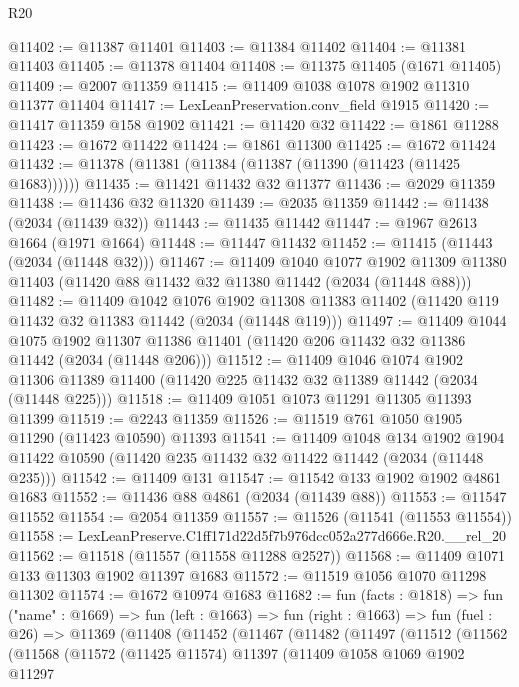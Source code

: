 \begin{lexlean}{R20}
\begin{coremodule}
@11402 := @11387 @11401
@11403 := @11384 @11402
@11404 := @11381 @11403
@11405 := @11378 @11404
@11408 := @11375 @11405 (@1671 @11405)
@11409 := @2007 @11359
@11415 := @11409 @1038 @1078 @1902 @11310 @11377 @11404
@11417 := LexLeanPreservation.conv_field @1915
@11420 := @11417 @11359 @158 @1902
@11421 := @11420 @32
@11422 := @1861 @11288
@11423 := @1672 @11422
@11424 := @1861 @11300
@11425 := @1672 @11424
@11432 := @11378 (@11381 (@11384 (@11387 (@11390 (@11423 (@11425 @1683))))))
@11435 := @11421 @11432 @32 @11377
@11436 := @2029 @11359
@11438 := @11436 @32 @11320
@11439 := @2035 @11359
@11442 := @11438 (@2034 (@11439 @32))
@11443 := @11435 @11442
@11447 := @1967 @2613 @1664 (@1971 @1664)
@11448 := @11447 @11432
@11452 := @11415 (@11443 (@2034 (@11448 @32)))
@11467 := @11409
    @1040
    @1077
    @1902
    @11309
    @11380
    @11403
    (@11420 @88 @11432 @32 @11380 @11442 (@2034 (@11448 @88)))
@11482 := @11409
    @1042
    @1076
    @1902
    @11308
    @11383
    @11402
    (@11420 @119 @11432 @32 @11383 @11442 (@2034 (@11448 @119)))
@11497 := @11409
    @1044
    @1075
    @1902
    @11307
    @11386
    @11401
    (@11420 @206 @11432 @32 @11386 @11442 (@2034 (@11448 @206)))
@11512 := @11409
    @1046
    @1074
    @1902
    @11306
    @11389
    @11400
    (@11420 @225 @11432 @32 @11389 @11442 (@2034 (@11448 @225)))
@11518 := @11409 @1051 @1073 @11291 @11305 @11393 @11399
@11519 := @2243 @11359
@11526 := @11519 @761 @1050 @1905 @11290 (@11423 @10590) @11393
@11541 := @11409
    @1048
    @134
    @1902
    @1904
    @11422
    @10590
    (@11420 @235 @11432 @32 @11422 @11442 (@2034 (@11448 @235)))
@11542 := @11409 @131
@11547 := @11542 @133 @1902 @1902 @4861 @1683
@11552 := @11436 @88 @4861 (@2034 (@11439 @88))
@11553 := @11547 @11552
@11554 := @2054 @11359
@11557 := @11526 (@11541 (@11553 @11554))
@11558 := LexLeanPreserve.C1ff171d22d5f7b976dcc052a277d666e.R20.__rel_20
@11562 := @11518 (@11557 (@11558 @11288 @2527))
@11568 := @11409 @1071 @133 @11303 @1902 @11397 @1683
@11572 := @11519 @1056 @1070 @11298 @11302
@11574 := @1672 @10974 @1683
@11682 := fun (facts : @1818) =>
  fun ("name" : @1669) =>
  fun (left : @1663) =>
  fun (right : @1663) =>
  fun (fuel : @26) =>
  @11369
    (@11408
      (@11452
        (@11467
          (@11482
            (@11497
              (@11512
                (@11562
                  (@11568
                    (@11572
                      (@11425 @11574)
                      @11397
                      (@11409
                        @1058
                        @1069
                        @1902
                        @11297

\end{coremodule}
\end{lexlean}
